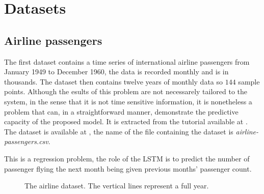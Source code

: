 \section{Datasets}

\subsection{Airline passengers}

The first dataset contains a time series of international airline passengers from January 1949 to December 1960, the data is recorded monthly and is in thousands. The dataset then contains twelve years of monthly data so $144$ sample points. Although the esults of this problem are not necessarely tailored to the system, in the sense that it is not time sensitive information, it is nonetheless a problem that can, in a straightforward manner, demonstrate the predictive capacity of the proposed model. It is extracted from the tutorial available at \cite{airline}. The dataset is available at \cite{datasets}, the name of the file containing the dataset is \textit{airline-passengers.csv}.

This is a regression problem, the role of the \ac{LSTM} is to predict the number of passenger flying the next month being given previous months' passenger count.

\begin{figure*}[h]
  \centering
  
  \caption{The airline dataset. The vertical lines represent a full year.}
  \label{graph:airline}
\end{figure*}
